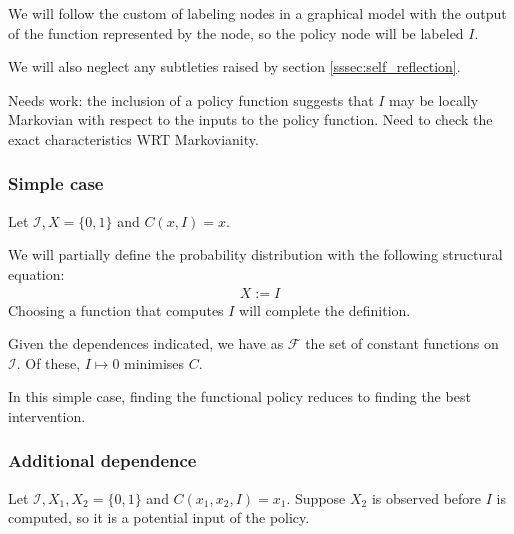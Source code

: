 We will follow the custom of labeling nodes in a graphical model with the output of the function represented by the node, so the policy node will be labeled $I$.

We will also neglect any subtleties raised by section \ref{sssec:self_reflection}.

Needs work: the inclusion of a policy function suggests that $I$ may be locally Markovian with respect to the inputs to the policy function. Need to check the exact characteristics WRT Markovianity.

\subsubsection{Simple case}\label{sssec:simple_case}

Let $\mathcal{I},X=\{0,1\}$ and $C(x,I)=x$.

\begin{center}
\end{center}

We will partially define the probability distribution with the following structural equation:
\begin{align*}
    X:=I
\end{align*}
Choosing a function that computes $I$ will complete the definition.

Given the dependences indicated, we have as $\mathcal{F}$ the set of constant functions on $\mathcal{I}$. Of these, $I\mapsto0$ minimises $C$.

In this simple case, finding the functional policy reduces to finding the best intervention. 

\subsubsection{Additional dependence}

Let $\mathcal{I},X_1,X_2=\{0,1\}$ and $C(x_1,x_2,I)=x_1$. Suppose $X_2$ is observed before $I$ is computed, so it is a potential input of the policy.

\begin{center}
\end{center}

